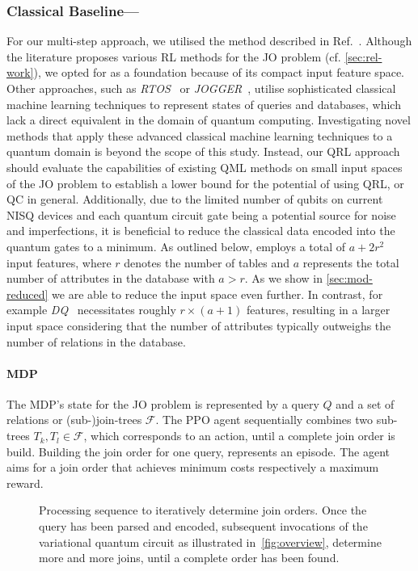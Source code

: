 \documentclass[10pt, conference]{IEEEtran}
\begin{document}
\subsubsection{Classical Baseline---\rj}
\label{sec:meth-rj}

For our multi-step approach, we utilised the method described in Ref.~\cite{marcus18}.
Although the literature proposes various RL methods for the JO problem (cf. \autoref{sec:rel-work}), we opted for \rj as a foundation because of its compact input feature space.
Other approaches, such as \emph{RTOS}~\cite{xiang20} or \emph{JOGGER}~\cite{chen22}, utilise sophisticated classical machine learning techniques to represent states of queries and databases, which lack a direct equivalent in the domain of quantum computing.
Investigating novel methods that apply these advanced classical machine learning techniques to a quantum domain is beyond the scope of this study.
Instead, our QRL approach should evaluate the capabilities of existing QML methods on small input spaces of the JO problem to establish a lower bound for the potential of using QRL, or QC in general.
Additionally, due to the limited number of qubits on current NISQ devices and each quantum circuit gate being a potential source for noise and imperfections, it is beneficial to reduce the classical data encoded into the quantum gates to a minimum.
As outlined below, \rj employs a total of $a + 2r^2$ input features, where $r$ denotes the number of tables and $a$ represents the total number of attributes in the database with $a > r$. As we show in \autoref{sec:mod-reduced} we are able to reduce the input space even further.
In contrast, for example \emph{DQ}~\cite{krishnan18} necessitates roughly $r \times (a + 1)$ features, resulting in a larger input space considering that the number of attributes typically outweighs the number of relations in the database.

\paragraph{MDP}
The MDP's state for the JO problem is represented by a query $Q$ and a set of relations or (sub-)join-trees $\mathcal{F}$.
The PPO agent sequentially combines two sub-trees $T_k, T_l \in \mathcal{F}$, which corresponds to an action, until a complete join order is build.
Building the join order for one query, represents an episode.
The agent aims for a join order that achieves minimum costs respectively a maximum reward.

\begin{figure}[htb]
 
 \vspace*{-0.5em}
  \caption{Processing sequence to iteratively determine join orders. Once the query has been parsed and encoded, subsequent invocations of the variational
  quantum circuit as illustrated in~\autoref{fig:overview},
  determine more and more joins, until a complete order has been found.}\label{fig:sequence}
\end{figure}
\end{document}
